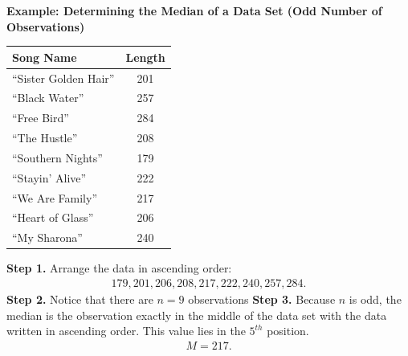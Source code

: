 \documentclass{report}
\begin{document}
        \begin{mdframed}
          \textbf{Example: Determining the Median of a Data Set (Odd Number of Observations)}
          \begin{center}
              \begin{tabular}{|l|c|}
                \hline
                \textbf{Song Name} & \textbf{Length} \\
                \hline
                ``Sister Golden Hair'' & 201 \\
                \hline
                ``Black Water'' & 257 \\
                \hline
                ``Free Bird'' & 284 \\
                \hline
                ``The Hustle'' & 208 \\
                \hline
                ``Southern Nights'' & 179 \\
                \hline
                ``Stayin' Alive'' & 222 \\
                \hline
                ``We Are Family'' & 217 \\
                \hline
                ``Heart of Glass'' & 206 \\
                \hline
                ``My Sharona'' & 240 \\
                \hline
                \end{tabular}
          \end{center}
          \bigbreak \noindent 
          \textbf{Step 1.} Arrange the data in ascending order:
          \begin{align*}
              179,201,206,208,217,222,240,257,284
          .\end{align*}
          \bigbreak \noindent 
          \textbf{Step 2.} Notice that there are $n=9$ observations 
          \bigbreak \noindent 
          \textbf{Step 3.} Because $n$ is odd, the median is the observation exactly in the middle of the data set with the data written in ascending order. This value lies in the $5^{th} $ position.
          \begin{align*}
              M= 217
          .\end{align*}
        \end{mdframed}
        \bigbreak \noindent 
\end{document}
